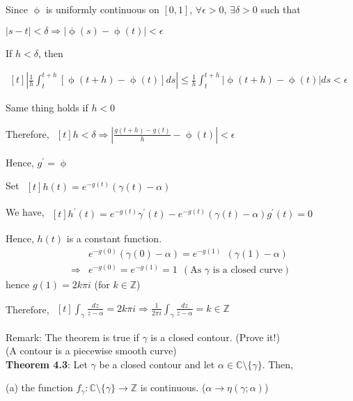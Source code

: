 \documentclass{article}
\begin{document}
\begin{flushleft}
Since $\upphi$ is uniformly continuous on $[0,1]$, $\forall \epsilon >0$, $\exists \delta>0$ such that 

$|s-t|<\delta \Rightarrow |\upphi(s)-\upphi(t)|<\epsilon$ 

If $h<\delta$, then

$\begin{aligned}[t] |\frac{1}{h}\int_{t}^{t+h}[\upphi(t+h)-\upphi(t)]ds|\leq \frac{1}{h}\int_{t}^{t+h}|\upphi(t+h)-\upphi(t)| ds<\epsilon \end{aligned}$

Same thing holds if $h<0$

Therefore, $\begin{aligned}[t] h<\delta \Rightarrow |\frac{g(t+h)-g(t)}{h}-\upphi(t)|<\epsilon \end{aligned}$

Hence, $g^{'}=\upphi$

Set $\begin{aligned}[t] h(t)=e^{-g(t)}(\gamma(t)-\alpha)\end{aligned}$

We have, $\begin{aligned}[t] h^{'}(t)=e^{-g(t)}\gamma^{'}(t)-e^{-g(t)}(\gamma(t)-\alpha)g^{'}(t)=0\end{aligned}$

Hence, $h(t)$ is a constant function.
\begin{align}
&e^{-g(0)}(\gamma(0)-\alpha)=e^{-g(1)}\:\:(\gamma(1)-\alpha)\nonumber \\
\Rightarrow &e^{-g(0)}=e^{-g(1)}=1 \:\:(\text{As $\gamma$ is a closed curve})\nonumber
\end{align}
hence $g(1)=2k\pi i$ (for $k\in \mathds{Z}$)

Therefore, $\begin{aligned}[t] \int_{\gamma}^{}\frac{dz}{z-\alpha}=2k\pi i\Rightarrow \frac{1}{2\pi i}\int_{\gamma}^{}\frac{dz}{z-\alpha}=k\in \mathds{Z} \end{aligned}$ 

Remark: The theorem is true if $\gamma$ is a closed contour. (Prove it!) \\(A contour is a piecewise smooth curve)\\
\vspace{3mm}
\textbf{Theorem 4.3}: Let $\gamma$ be a closed contour and let $\alpha \in \mathds{C}\setminus \{\gamma\}$. Then,

(a) the function $f_{\gamma}: \mathds{C}\setminus \{\gamma\}\rightarrow \mathds{Z}$ is continuous. ($\alpha \rightarrow \eta(\gamma;\alpha)$)


\end{flushleft}
\end{document}
